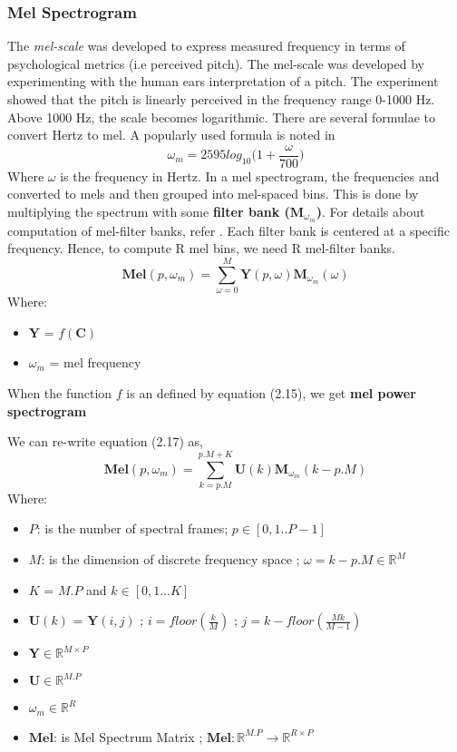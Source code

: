 \subsubsection{Mel Spectrogram}

The \textit{mel-scale} was developed to express measured frequency in terms of psychological metrics (i.e perceived pitch). The mel-scale was developed
by experimenting with the human ears interpretation of a pitch. The experiment showed that the pitch is linearly perceived in the frequency range 0-1000 Hz. Above
1000 Hz, the scale becomes logarithmic. There are several formulae to convert Hertz to mel. A popularly used formula is noted in \cite{speech}
\begin{equation}
\omega_{m} = 2595log_{10}\bigg(1+\frac{ \omega }{700}\bigg)
\end{equation}
Where $\omega$ is the frequency in Hertz. In a mel spectrogram, the frequencies and converted to mels and then grouped into mel-spaced bins. This is done by multiplying the spectrum with some \textbf{filter bank ($\textbf{M}_{\omega_{m}}$)}. For details about computation of mel-filter banks, refer \cite{mel}. Each filter bank is centered at a specific frequency. Hence, to compute R mel bins, we need R mel-filter banks. 
\begin{equation}
\textbf{Mel}(p,\omega_{m}) = \displaystyle\sum_{ \omega = 0}^{M}\textbf{Y}(p, \omega)\textbf{M}_{\omega_{m}}(\omega)
\end{equation}
Where:
\begin{itemize}[label=]
    \setlength\itemsep{0em}
    \item $\textbf{Y}$ = $f(\textbf{C})$
    \item $\omega_{m}$ = mel frequency
\end{itemize}    
When the function $f$ is an defined by equation (2.15), we get \textbf{mel power spectrogram}
\bigskip

\noindent We can re-write equation (2.17) as, 
\begin{equation}
\textbf{Mel}(p,\omega_{m}) = \displaystyle\sum_{k=p.M}^{p.M + K}\textbf{U}(k)\textbf{M}_{\omega_{m}}(k-p.M)
\end{equation}
Where:
\begin{itemize}[label=]
    \setlength\itemsep{0em}
    \item $P$: is the number of spectral frames; $p \in [0,1..P-1]$ 
    \item $M$: is the dimension of discrete frequency space ; $\omega = k-p.M \in \mathbb{R}^{M}$
    \item $K$ = $M.P$ and $k \in [0,1...K]$
    \item $\textbf{U}(k)$ = $\textbf{Y}(i,j)$ ; $i = floor(\frac{k}{M})$ ; $j = k-floor(\frac{Mk}{M-1})$
    \item $\textbf{Y} \in \mathbb{R}^{M \times P}$
    \item $\textbf{U} \in \mathbb{R}^{M.P}$
    \item $\omega_{m} \in  \mathbb{R}^{R}$
    \item $\textbf{Mel}$: is Mel Spectrum Matrix ; $\textbf{Mel} : \mathbb{R}^{M.P} \rightarrow \mathbb{R}^{R \times P}$
\end{itemize}

